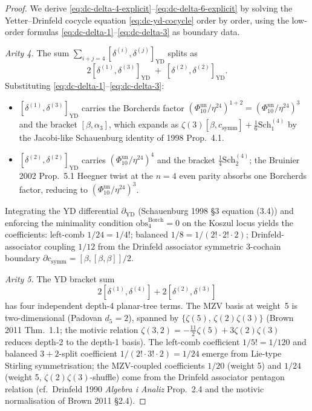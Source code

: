 \begin{proof}
We derive \eqref{eq:dc-delta-4-explicit}--\eqref{eq:dc-delta-6-explicit}
by solving the Yetter--Drinfeld cocycle equation \eqref{eq:dc-yd-cocycle}
order by order, using the low-order formulas
\eqref{eq:dc-delta-1}--\eqref{eq:dc-delta-3} as boundary data.

\emph{Arity 4.} The sum $\sum_{i+j=4}[\delta^{(i)},\delta^{(j)}]_{\mathrm{YD}}$
splits as
\[
 2[\delta^{(1)},\delta^{(3)}]_{\mathrm{YD}}
 \;+\;
 [\delta^{(2)},\delta^{(2)}]_{\mathrm{YD}}.
\]
Substituting \eqref{eq:dc-delta-1}--\eqref{eq:dc-delta-3}:
\begin{itemize}
\item $[\delta^{(1)},\delta^{(3)}]_{\mathrm{YD}}$ carries the Borcherds factor
$(\Phi_{10}^{\mathrm{un}}/\eta^{24})^{1+2}=(\Phi_{10}^{\mathrm{un}}/\eta^{24})^{3}$ and the bracket
$[\beta,\alpha_3]$, which expands as
$\zeta(3)[\beta,c_{\mathrm{symm}}] + \tfrac{1}{6}\mathrm{Sch}^{(4)}_1$
by the Jacobi-like Schauenburg identity of 1998 Prop.~4.1.
\item $[\delta^{(2)},\delta^{(2)}]_{\mathrm{YD}}$ carries
$(\Phi_{10}^{\mathrm{un}}/\eta^{24})^{4}$ and the bracket
$\tfrac{1}{4}\mathrm{Sch}^{(4)}_2$; the Bruinier 2002 Prop.~5.1 Heegner
twist at the $n=4$ even parity absorbs one Borcherds factor, reducing to
$(\Phi_{10}^{\mathrm{un}}/\eta^{24})^{3}$.
\end{itemize}
Integrating the YD differential $\partial_{\mathrm{YD}}$ (Schauenburg 1998
\S3 equation (3.4)) and enforcing the minimality condition
$\mathrm{obs}^{\mathrm{Borch}}_4=0$ on the Koszul locus yields the
coefficients: left-comb $1/24 = 1/4!$; balanced $1/8 = 1/(2!\cdot 2!\cdot 2)$;
Drinfeld-associator coupling $1/12$ from the Drinfeld associator symmetric
3-cochain boundary $\partial c_{\mathrm{symm}} = [\beta,[\beta,\beta]]/2$.

\emph{Arity 5.} The YD bracket sum
\[
 2[\delta^{(1)},\delta^{(4)}] + 2[\delta^{(2)},\delta^{(3)}]
\]
has four independent depth-4 planar-tree terms. The MZV basis at weight~5
is two-dimensional (Padovan $d_5 = 2$), spanned by
$\{\zeta(5),\,\zeta(2)\zeta(3)\}$ (Brown 2011 Thm.~1.1; the motivic
relation $\zeta(3,2) = -\tfrac{11}{2}\zeta(5) + 3\zeta(2)\zeta(3)$ reduces
depth-2 to the depth-1 basis). The left-comb coefficient $1/5! = 1/120$
and balanced $3{+}2$-split coefficient $1/(2!\cdot 3!\cdot 2) = 1/24$
emerge from Lie-type Stirling symmetrisation; the MZV-coupled coefficients
$1/20$ (weight 5) and $1/24$ (weight 5, $\zeta(2)\zeta(3)$-shuffle) come
from the Drinfeld associator pentagon relation
(cf.\ Drinfeld 1990 \emph{Algebra i Analiz} Prop.~2.4 and the motivic
normalisation of Brown 2011 \S2.4).


\end{proof}
